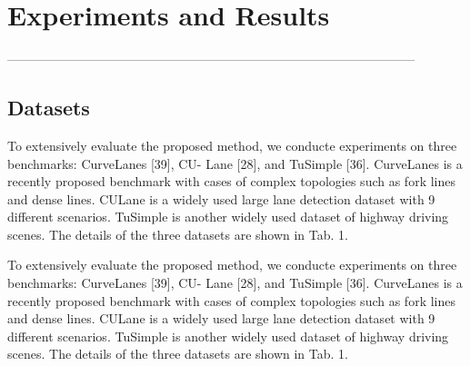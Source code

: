 
\chapter{Experiments and Results} %

\label{Chapter5} %



------------------------------------------------------------------------------------------------

\section{Datasets}


\begin{table}[]
\centering
{}
\caption{}
\label{tab:my-table}
\end{table}

To extensively evaluate the proposed method, we conducte
experiments on three benchmarks: CurveLanes [39], CU-
Lane [28], and TuSimple [36]. CurveLanes is a recently
proposed benchmark with cases of complex topologies such
as fork lines and dense lines. CULane is a widely used large
lane detection dataset with 9 different scenarios. TuSimple
is another widely used dataset of highway driving scenes.
The details of the three datasets are shown in Tab. 1.

To extensively evaluate the proposed method, we conducte
experiments on three benchmarks: CurveLanes [39], CU-
Lane [28], and TuSimple [36]. CurveLanes is a recently
proposed benchmark with cases of complex topologies such
as fork lines and dense lines. CULane is a widely used large
lane detection dataset with 9 different scenarios. TuSimple
is another widely used dataset of highway driving scenes.
The details of the three datasets are shown in Tab. 1.





